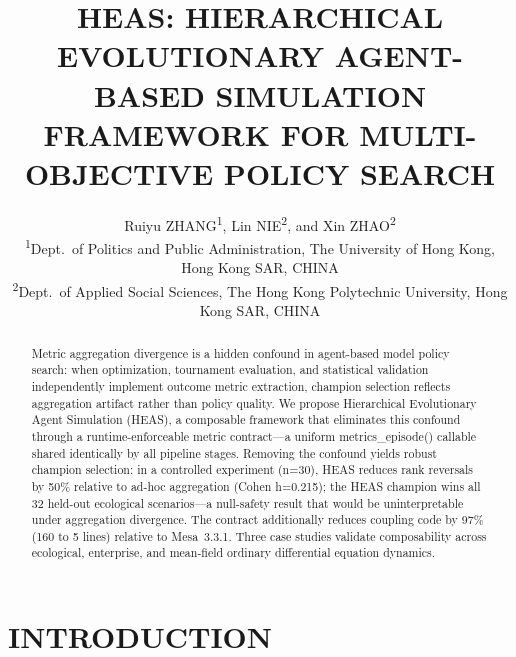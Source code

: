 \documentclass{wscpaperproc}
\begin{document}

\title{HEAS: HIERARCHICAL EVOLUTIONARY AGENT-BASED SIMULATION FRAMEWORK
       FOR MULTI-OBJECTIVE POLICY SEARCH}

\author{\begin{center}Ruiyu ZHANG\textsuperscript{1}, Lin NIE\textsuperscript{2}, and Xin ZHAO\textsuperscript{2}\\
[11pt]
\textsuperscript{1}Dept.~of Politics and Public Administration, The University of Hong Kong, Hong Kong SAR, CHINA\\
\textsuperscript{2}Dept.~of Applied Social Sciences, The Hong Kong Polytechnic University, Hong Kong SAR, CHINA\end{center}
}

\maketitle

\vspace{-12pt}

\begin{abstract}
Metric aggregation divergence is a hidden confound in agent-based model policy
search: when optimization, tournament evaluation, and statistical validation
independently implement outcome metric extraction, champion selection reflects
aggregation artifact rather than policy quality. We propose Hierarchical Evolutionary Agent Simulation (HEAS), a composable
framework that eliminates this confound through a runtime-enforceable metric
contract---a uniform metrics\_episode() callable shared identically by all
pipeline stages. Removing the confound yields robust champion selection: in a controlled experiment (n=30), HEAS reduces rank reversals by 50\%
relative to ad-hoc aggregation (Cohen h=0.215); the HEAS champion wins all 32
held-out ecological scenarios---a null-safety result that would be
uninterpretable under aggregation divergence. The contract additionally reduces
coupling code by 97\% (160 to 5 lines) relative to Mesa~3.3.1. Three case
studies validate composability across ecological, enterprise, and mean-field ordinary differential equation
dynamics.
\end{abstract}

\section{INTRODUCTION}
\end{document}

